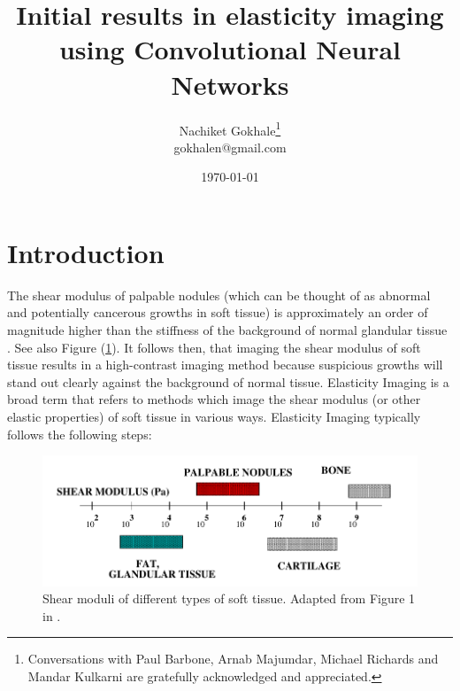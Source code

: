 \documentclass[12pt]{article}
\begin{document}
\title{Initial results in elasticity imaging using Convolutional Neural Networks}
\author{Nachiket Gokhale\footnote{Conversations with Paul Barbone, Arnab Majumdar, Michael Richards and Mandar Kulkarni are gratefully acknowledged and appreciated.}\\gokhalen@gmail.com}
\date{\today}
\maketitle
{}
\section{Introduction}
The shear modulus of palpable nodules (which can be thought of as abnormal and potentially cancerous growths in soft tissue) is approximately an order of magnitude higher than the stiffness of the background of normal glandular tissue \cite{paper:sarv1998}. See also Figure (\ref{fig:shearmod}). It follows then, that imaging the shear modulus of soft tissue results in a high-contrast imaging method because suspicious growths will stand out clearly against the background of normal tissue. Elasticity Imaging is a broad term that refers to methods which image the shear modulus (or other elastic properties) of soft tissue in various ways. Elasticity Imaging typically follows the following steps:
%
\begin{figure}
   \centering
    \includegraphics[totalheight=3cm]{Figures/shearmod.png}
  \caption{\label{fig:shearmod} Shear moduli of different types of soft tissue. Adapted from Figure 1 in \cite{paper:sarv1998}.}
\end{figure}
%
\end{document}
